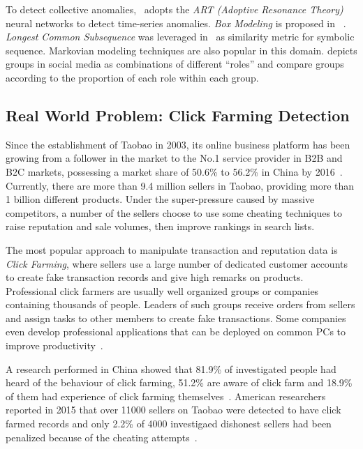 \documentclass[10pt,conference,letterpaper]{IEEEtran}
\begin{document}
			To detect collective anomalies,~\cite{caudell1993adaptive} adopts the \textit{ART (Adoptive Resonance Theory)} neural networks to detect time-series anomalies. \textit{Box Modeling} is proposed in ~\cite{chan2005modeling}. \textit{Longest Common Subsequence} was leveraged in~\cite{budalakoti2006anomaly} as similarity metric for symbolic sequence. Markovian modeling techniques are also popular in this domain\cite{ye2000markov,warrender1999detecting,pavlov2003sequence}. \cite{yu2015glad} depicts groups in social media as combinations of different ``roles'' and compare groups according to the proportion of each role within each group.
	
		\subsection{Real World Problem: Click Farming Detection}\label{sec:related-realworld}
			Since the establishment of Taobao in 2003, its online business platform has been growing from a follower in the market to the No.1 service provider in B2B and B2C markets, possessing a market share of 50.6\% to 56.2\% in China by 2016~\cite{iresearch2016b2c}. Currently, there are more than 9.4 million sellers in Taobao, providing more than 1 billion different products. Under the super-pressure caused by massive competitors, a number of the sellers choose to use some cheating techniques to raise reputation and sale volumes, then improve rankings in search lists.
			
			The most popular approach to manipulate transaction and reputation data is \textit{Click Farming}, where sellers use a large number of dedicated customer accounts to create fake transaction records and give high remarks on products. Professional click farmers are usually well organized groups or companies containing thousands of people. Leaders of such groups receive orders from sellers and assign tasks to other members to create fake transactions. Some companies even develop professional applications that can be deployed on common PCs to improve productivity~\cite{zhao2016on}.
	
			A research performed in China showed that 81.9\% of investigated people had heard of the behaviour of click farming, 51.2\% are aware of click farm and 18.9\% of them had experience of click farming themselves~\cite{yan2015report}. American researchers reported in 2015 that over 11000 sellers on Taobao were detected to have click farmed records and only 2.2\% of 4000 investigaed dishonest sellers had been penalized because of the cheating attempts~\cite{netease2015research}.
			
\end{document}
